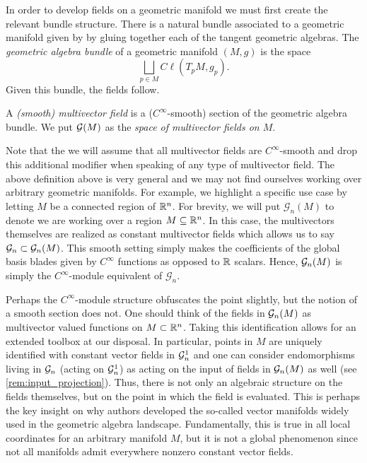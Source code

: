 In order to develop fields on a geometric manifold we must first create the relevant bundle structure. There is a natural bundle associated to a  geometric manifold given by by gluing together each of the tangent geometric algebras. The \emph{geometric algebra bundle} of a geometric manifold $(M,g)$ is the space
\begin{equation}
\bigsqcup_{p \in M} C\ell(T_pM,g_p).
\end{equation}
Given this bundle, the fields follow.
\begin{definition}
A \emph{(smooth) multivector field} is a ($C^{\infty}$-smooth) section of the geometric algebra bundle. We put $\mathcal{G}(M)$ as the \emph{space of multivector fields on $M$}.
\end{definition}
Note that the we will assume that all multivector fields are $C^\infty$-smooth and drop this additional modifier when speaking of any type of multivector field. The above definition above is very general and we may not find ourselves working over arbitrary geometric manifolds. For example, we highlight a specific use case by letting $M$ be a connected region of $\mathbb{R}^n$. For brevity, we will put $\mathcal{G}_n(M)$ to denote we are working over a region $M\subseteq \mathbb{R}^n$. In this case, the multivectors themselves are realized as constant multivector fields which allows us to say $\mathcal{G}_n \subset \mathcal{G}_n(M)$. This smooth setting simply makes the coefficients of the global basis blades given by $C^\infty$ functions as opposed to $\mathbb{R}$ scalars.  Hence, $\mathcal{G}_n(M)$ is simply the $C^{\infty}$-module equivalent of $\mathcal{G}_n$.

Perhaps the $C^\infty$-module structure obfuscates the point slightly, but the notion of a smooth section does not.  One should think of the fields in $\mathcal{G}_n(M)$ as multivector valued functions on $M \subset \mathbb{R}^n$. Taking this identification allows for an extended toolbox at our disposal. In particular, points in $M$ are uniquely identified with constant vector fields in $\mathcal{G}_n^1$ and one can consider endomorphisms living in $\mathcal{G}_n$ (acting on $\mathcal{G}_n^1$) as acting on the input of fields in $\mathcal{G}_n(M)$ as well (see \cref{rem:input_projection}).  Thus, there is not only an algebraic structure on the fields themselves, but on the point in which the field is evaluated.  This is perhaps the key insight on why authors developed the so-called vector manifolds widely used in the geometric algebra landscape. Fundamentally, this is true in all local coordinates for an arbitrary manifold $M$, but it is not a global phenomenon since not all manifolds admit everywhere nonzero constant vector fields. 

